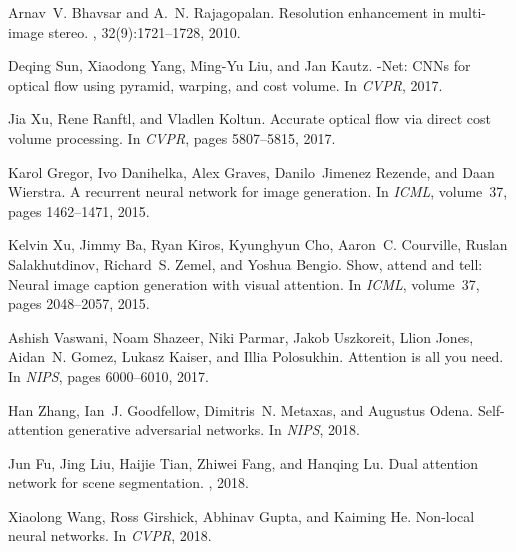 \documentclass[10pt,twocolumn,letterpaper]{article}
\begin{document}
\begin{thebibliography}{10}
	Arnav~V. Bhavsar and A.~N. Rajagopalan.
	\newblock Resolution enhancement in multi-image stereo.
	, 32(9):1721--1728,
	2010.
	
	Deqing Sun, Xiaodong Yang, Ming{-}Yu Liu, and Jan Kautz.
	-{N}et: {CNN}s for optical flow using pyramid, warping, and cost
	volume.
	\newblock In {\em CVPR}, 2017.
	
	Jia Xu, Rene Ranftl, and Vladlen Koltun.
	\newblock Accurate optical flow via direct cost volume processing.
	\newblock In {\em CVPR}, pages 5807--5815, 2017.
	
	Karol Gregor, Ivo Danihelka, Alex Graves, Danilo~Jimenez Rezende, and Daan
	Wierstra.
	 {A} recurrent neural network for image generation.
	\newblock In {\em ICML}, volume~37, pages 1462--1471, 2015.
	
	Kelvin Xu, Jimmy Ba, Ryan Kiros, Kyunghyun Cho, Aaron~C. Courville, Ruslan
	Salakhutdinov, Richard~S. Zemel, and Yoshua Bengio.
	\newblock Show, attend and tell: Neural image caption generation with visual
	attention.
	\newblock In {\em ICML}, volume~37, pages 2048--2057, 2015.
	
	Ashish Vaswani, Noam Shazeer, Niki Parmar, Jakob Uszkoreit, Llion Jones,
	Aidan~N. Gomez, Lukasz Kaiser, and Illia Polosukhin.
	\newblock Attention is all you need.
	\newblock In {\em NIPS}, pages 6000--6010, 2017.
	
	Han Zhang, Ian~J. Goodfellow, Dimitris~N. Metaxas, and Augustus Odena.
	\newblock Self-attention generative adversarial networks.
	\newblock In {\em NIPS}, 2018.
	
	Jun Fu, Jing Liu, Haijie Tian, Zhiwei Fang, and Hanqing Lu.
	\newblock Dual attention network for scene segmentation.
	, 2018.
	
	Xiaolong Wang, Ross Girshick, Abhinav Gupta, and Kaiming He.
	\newblock Non-local neural networks.
	\newblock In {\em CVPR}, 2018.
	

\end{thebibliography}
\end{document}
